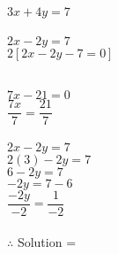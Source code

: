\vspce
\item $ 3x+4y = 7$ \\
\redcheck \\

$ 2x-2y = 7 $ \\
$ 2[2x-2y -7= 0 ]$ \redcheck \\
\redcheck \\


$ 7x -21=0$ \\
$ \dfrac{7x}{7}  =\dfrac{21}{7}$ \redcheck \\
\redcheck \\

$ 2x-2y = 7 $ \redcheck \\
$ 2(3)-2y = 7 $ \redcheck \\
$ 6-2y = 7 $ \redcheck \\
$ -2y = 7-6 $ \redcheck \\
$ \dfrac{-2y}{-2}  = \dfrac{1}{-2}  $ \redcheck \\
\redcheck \\

$\therefore$ Solution =  \redcheck 


 


